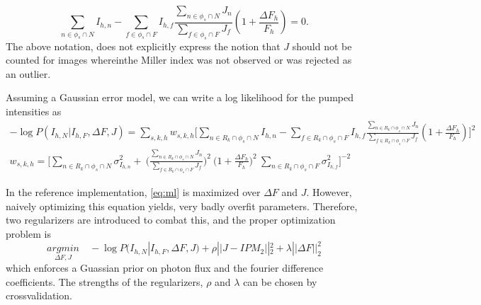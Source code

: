 \documentclass{report}
\begin{document}
\begin{equation}
\sum_{n\in \phi_s\cap N} I_{h,n} - \sum_{f\in \phi_s\cap F} I_{h,f} \frac{\sum_{n\in\phi_s\cap N} J_n}{\sum_{f\in\phi_s\cap F} J_f} ( 1 + \frac{\Delta F_{h}} {F_{h}}) = 0. 
\end{equation}
The above notation, does not explicitly express the notion that $J$ should not be counted for images whereinthe Miller index was not observed or was rejected as an outlier. 

Assuming a Gaussian error model, we can write a log likelihood for the pumped intensities as 
\begin{equation}\label{eq:ml}
\begin{aligned}
-\log P(I_{h,N}|I_{h,F},\Delta F, J) = \sum_{s,k,h}w_{s,k,h} \bigg[ \sum_{n\in R_k \cap \phi_s\cap N} I_{h,n} - \sum_{f\in R_k \cap \phi_s\cap F} I_{h,f} \frac{\sum_{n\in R_k \cap \phi_s\cap N} J_n}{\sum_{f\in R_k \cap \phi_s\cap F} J_f} ( 1 + \frac{\Delta F_{h}} {F_{h}}) \bigg]^2  \\
w_{s,k,h} = \bigg[\sum_{n\in R_k\cap \phi_s\cap N}\sigma^2_{I_{h,n}} + \
             \bigg(\frac {\sum_{n\in R_k \cap \phi_s\cap N} J_n}{\sum_{f\in R_k \cap \phi_s\cap F} J_f}\bigg)^2\
             \bigg(1 + \frac{\Delta F_h}{F_h}\bigg)^2 \
             \sum_{n\in R_k\cap \phi_s\cap F}\sigma^2_{I_{h,f}}\bigg]^{-2}
\end{aligned}
\end{equation}

In the reference implementation, \eqref{eq:ml} is maximized over $\Delta F$ and $J$. However, naively optimizing this equation yields, very badly overfit parameters. Therefore, two regularizers are introduced to combat this, and the proper optimization problem is
\begin{equation}
\underset{\Delta F,J}{argmin} \quad -\log P(I_{h,N}|I_{h,F}, \Delta F, J) + \rho ||J - IPM_2||_2^2 + \lambda ||\Delta F||_2^2
\end{equation}
which enforces a Guassian prior on photon flux and the fourier difference coefficients. 
The strengths of the regularizers, $\rho$ and $\lambda$ can be chosen by crossvalidation. 
\end{document}
